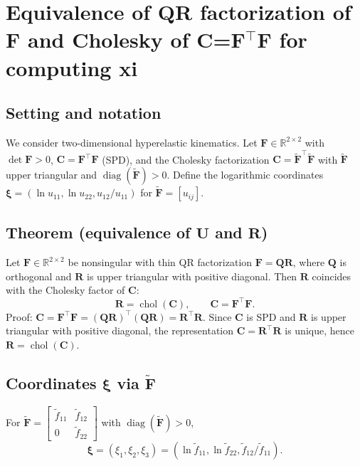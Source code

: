 \documentclass[journal,article,submit,pdftex,moreauthors]{Definitions/mdpi}
\newcommand{\vect}[1]{\boldsymbol{#1}}
\begin{document}
\appendixstart
\appendix
\section{Equivalence of QR factorization of F and Cholesky of C=F$^{\top}$F for computing xi}
\label{app:cholesky}

\subsection{Setting and notation}
We consider two-dimensional hyperelastic kinematics. Let $\vect F\in\mathbb R^{2\times 2}$ with $\det\vect F>0$, $\vect C=\vect F^{\top}\vect F$ (SPD), and the Cholesky factorization $\vect C=\tilde{\vect F}^{\top}\tilde{\vect F}$ with $\tilde{\vect F}$ upper triangular and $\operatorname{diag}(\tilde{\vect F})>0$. Define the logarithmic coordinates $\boldsymbol{\xi}=(\ln u_{11},\ln u_{22}, u_{12}/u_{11})$ for $\tilde{\vect F}=[u_{ij}]$.

\subsection{Theorem (equivalence of $\vect U$ and $\vect R$)}
Let $\vect F\in\mathbb R^{2\times 2}$ be nonsingular with thin QR factorization $\vect F=\vect Q\vect R$, where $\vect Q$ is orthogonal and $\vect R$ is upper triangular with positive diagonal. Then $\vect R$ coincides with the Cholesky factor of $\vect C$:
\begin{equation}
\vect R = \operatorname{chol}(\vect C),\qquad \vect C=\vect F^{\top}\vect F.
\end{equation}
Proof: $\vect C=\vect F^{\top}\vect F=(\vect Q\vect R)^{\top}(\vect Q\vect R)=\vect R^{\top}\vect R$. Since $\vect C$ is SPD and $\vect R$ is upper triangular with positive diagonal, the representation $\vect C=\vect R^{\top}\vect R$ is unique, hence $\vect R=\operatorname{chol}(\vect C)$.

\subsection{Coordinates $\boldsymbol{\xi}$ via $\tilde{\vect F}$}
For $\tilde{\vect F}=\begin{bmatrix} \tilde f_{11} & \tilde f_{12} \\ 0 & \tilde f_{22} \end{bmatrix}$ with $\operatorname{diag}(\tilde{\vect F})>0$,
\begin{equation}
\boldsymbol{\xi}=(\xi_1,\xi_2,\xi_3)=(\ln\tilde f_{11}, \ln\tilde f_{22}, \tilde f_{12}/\tilde f_{11}).
\end{equation}
\end{document}
